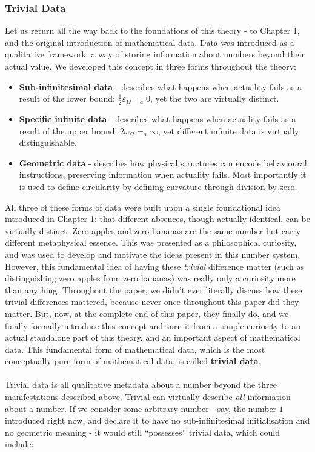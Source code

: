 \documentclass{article}
\begin{document}
\subsubsection{Trivial Data}

Let us return all the way back to the foundations of this theory - to Chapter 
1, and the original introduction of mathematical data. Data was introduced 
as a qualitative framework: a way of storing information about numbers 
beyond their actual value. We developed this concept in three forms 
throughout the theory:

\begin{itemize}
\item \textbf{Sub-infinitesimal data} - describes what happens when 
actuality fails as a result of the lower bound: $\frac{1}{2}\varepsilon_\Omega =_a 0$, 
yet the two are virtually distinct.
\item \textbf{Specific infinite data} - describes what happens when 
actuality fails as a result of the upper bound: $2\omega_\Omega =_a \infty$, 
yet different infinite data is virtually distinguishable.
\item \textbf{Geometric data} - describes how physical structures can 
encode behavioural instructions, preserving information when actuality 
fails. Most importantly it is used to define circularity by defining curvature through 
division by zero.
\end{itemize}

All three of these forms of data were built upon a single foundational 
idea introduced in Chapter 1: that different absences, though actually 
identical, can be virtually distinct. Zero apples and zero bananas are 
the same number but carry different metaphysical essence. This was 
presented as a philosophical curiosity, and was used to develop and motivate the ideas present in this number system. However, this fundamental idea of having these \textit{trivial} difference matter (such as distinguishing zero apples from zero bananas) was really only a curiosity more than anything. Throughout the paper, we didn't ever literally discuss how these trivial differences mattered, because never once throughout this paper did they matter. But, now, at the complete end of this paper, they finally do, and we finally formally introduce this concept and turn it from a simple curiosity to an actual standalone part of this theory, and an important aspect of mathematical data. This fundamental form of mathematical data, which is the most 
conceptually pure form of mathematical data, is called \textbf{trivial data}.\\\\
Trivial data is all qualitative metadata about a number beyond the three 
manifestations described above. Trivial can virtually describe \textit{all} information about a number. If we consider some arbitrary number - say, 
the number $1$ introduced right now, and declare it to have no sub-infinitesimal 
initialisation and no geometric meaning - it would still ``possesses'' trivial 
data, which could include:
\end{document}
